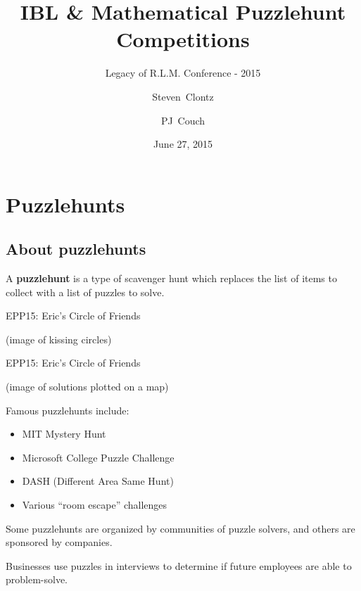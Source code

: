 \documentclass{beamer}
\title
{IBL \& Mathematical Puzzlehunt Competitions}
\subtitle
{Legacy of R.L.M. Conference - 2015} %
\author%
{Steven~Clontz\inst{1} \and PJ~Couch\inst{2}}%
\institute %
{
  \inst{1}
  Auburn, AL
  \and
  \inst{2}
  Lamar University
}
\date[15-06-27] %
{June 27, 2015}
\theoremstyle{theorem}
\theoremstyle{definition}
\newcommand{\<}{\langle}
\renewcommand{\>}{\rangle}
\newcommand{\vpause}{\pause\vspace{1em}}
\begin{document}

\begin{frame}
  \titlepage
\end{frame}


\section{Puzzlehunts}

\subsection{About puzzlehunts}

\begin{frame}
  A \textbf{puzzlehunt} is a type of scavenger hunt which replaces
  the list of items to collect
  with a list of puzzles to solve.
\end{frame}

\begin{frame}
  EPP15: Eric's Circle of Friends

  (image of kissing circles)
\end{frame}

\begin{frame}
  EPP15: Eric's Circle of Friends

  (image of solutions plotted on a map)
\end{frame}

\begin{frame}
  Famous puzzlehunts include:
  \begin{itemize}\small
  \item MIT Mystery Hunt
  \item Microsoft College Puzzle Challenge
  \item DASH (Different Area Same Hunt)
  \item Various ``room escape'' challenges
  \end{itemize}

  \vpause

  Some puzzlehunts are organized by communities of puzzle solvers,
  and others are sponsored by companies.

  \vpause

  Businesses use puzzles in interviews to determine if
  future employees are able to problem-solve.
\end{frame}
\end{document}
